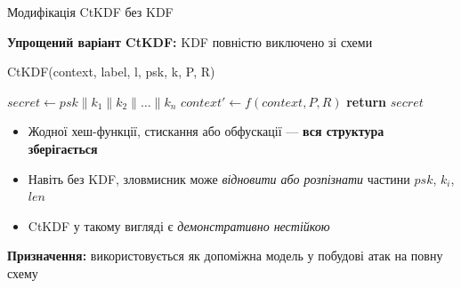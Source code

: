 \documentclass{beamer}
\begin{document}
\begin{frame}{Модифікація CtKDF без KDF}

\vspace{0.5em}
\textbf{Упрощений варіант CtKDF:} KDF повністю виключено зі схеми

\vspace{0.5em}
\begin{block}{CtKDF(context, label, l, psk, k, P, R)}
\begin{algorithmic}
  \State $secret \gets psk \| k_1 \| k_2 \| \dots \| k_n$
  \State $context' \gets f(context, P, R)$
  \State \textbf{return} $secret$
\end{algorithmic}
\end{block}

\vspace{0.5em}
\begin{itemize}
  \item Жодної хеш-функції, стискання або обфускації — \textbf{вся структура зберігається}
  \item Навіть без KDF, зловмисник може \textit{відновити або розпізнати} частини $psk$, $k_i$, $len$
  \item CtKDF у такому вигляді є \textit{демонстративно нестійкою}
\end{itemize}

\vspace{0.5em}
\textbf{Призначення:} використовується як допоміжна модель у побудові атак на повну схему

\end{frame}
\end{document}
